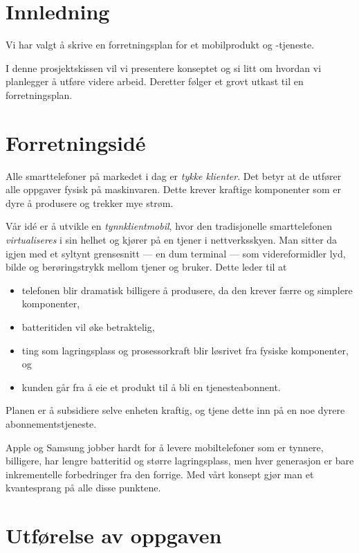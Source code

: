 \section{Innledning}

Vi har valgt å skrive en forretningsplan for et mobilprodukt og -tjeneste.

I denne prosjektskissen vil vi presentere konseptet og si litt om hvordan vi
planlegger å utføre videre arbeid. Deretter følger et grovt utkast til en
forretningsplan.

\section{Forretningsidé}

Alle smarttelefoner på markedet i dag er \textit{tykke klienter}. Det betyr at
de utfører alle oppgaver fysisk på maskinvaren. Dette krever kraftige
komponenter som er dyre å produsere og trekker mye strøm.

Vår idé er å utvikle en \textit{tynnklientmobil}, hvor den tradisjonelle
smarttelefonen \textit{virtualiseres} i sin helhet og kjører på en tjener i
nettverksskyen. Man sitter da igjen med et syltynt grensesnitt --- en dum terminal ---
som videreformidler lyd, bilde og berøringstrykk mellom tjener og bruker. Dette
leder til at

\begin{itemize}
  \item telefonen blir dramatisk billigere å produsere, da den krever færre og
    simplere komponenter,
  \item batteritiden vil øke betraktelig,
  \item ting som lagringsplass og prosessorkraft blir løsrivet fra fysiske
    komponenter, og
  \item kunden går fra å eie et produkt til å bli en tjenesteabonnent.
\end{itemize}

Planen er å subsidiere selve enheten kraftig, og tjene dette inn på en noe
dyrere abonnementstjeneste.

Apple og Samsung jobber hardt for å levere mobiltelefoner som er tynnere,
billigere, har lengre batteritid og større lagringsplass, men hver generasjon
er bare inkrementelle forbedringer fra den forrige.  Med vårt konsept gjør man
et kvantesprang på alle disse punktene.

\section{Utførelse av oppgaven}

